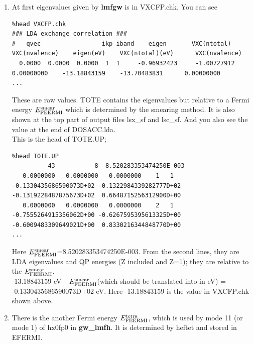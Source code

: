 \documentclass[a4paper,10pt,epsf,fleqn]{article}
\newcommand{\exe}[1]{{\bf #1}}
\newcommand{\io}[1]{{\sf  #1}}
\begin{document}
{\begin{enumerate}
\item 
At first eigenvalues given by \exe{lmfgw} is in \io{VXCFP.chk}. You can see
{\baselineskip=3mm \small
\begin{verbatim}
%head VXCFP.chk
### LDA exchange correlation ###
#   qvec                 ikp iband    eigen       VXC(ntotal)     VXC(nvalence)    eigen(eV)    VXC(ntotal)(eV)      VXC(nvalence)
  0.0000  0.0000  0.0000  1  1     -0.96932423     -1.00727912      0.00000000    -13.18843159    -13.70483831      0.00000000
...
\end{verbatim}}
These are raw values.
{\sf TOTE} contains the eigenvalues but relative to a Fermi energy
$E_{\rm FEERMI}^{\rm smear}$ which is determined by the smearing method.
It is also shown at the top part of output files \io{lsx\_sf} and \io{lsc\_sf}.
And you also see the value at the end of \io{DOSACC.lda}.\\

This is the head of \io{TOTE.UP};
{\baselineskip=3mm \small
\begin{verbatim}
%head TOTE.UP
          43           8  8.520283353474250E-003
   0.0000000   0.0000000   0.0000000    1   1  -0.1330435686590073D+02 -0.1322984339282777D+02 -0.1319228487875673D+02  0.6648715256312900D+00
   0.0000000   0.0000000   0.0000000    2   1  -0.7555264915356062D+00 -0.6267595395613325D+00 -0.6009483309649021D+00  0.8330216344848770D+00
...
\end{verbatim}}

Here $E_{\rm FEERMI}^{\rm smear}$=8.520283353474250E-003. 
From the second lines, they are LDA eigenvalues and QP energies 
(Z included and Z=1); they are relative to the $E_{\rm FEERMI}^{\rm smear}$.\\
-13.18843159 eV - $E_{\rm FEERMI}^{\rm smear}$(which should be translated into in eV)  
= -0.1330435686590073D+02 eV.
Here -13.18843159 is the value in \io{VXCFP.chk} shown above.


\item
There is the another Fermi energy $E_{\rm FEERMI}^{\rm tetra}$, 
which is used by mode 11 (or mode 1) of hx0fp0 in {\bf gw\_lmfh}.
It is determined by heftet and stored in \io{EFERMI}.


\end{enumerate}}
\end{document}
